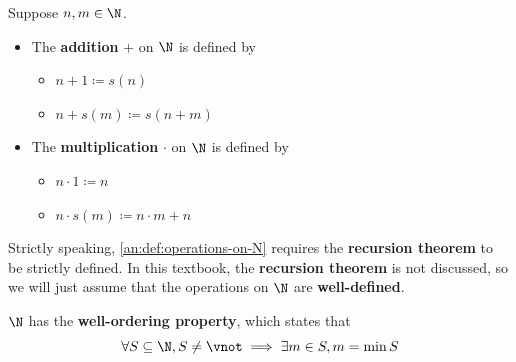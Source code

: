 \bigskip

\begin{definition} \label{an:def:operations-on-N}
  Suppose $n, m \in \N$.
  \begin{itemize}
    \item The \textbf{addition} $+$ on $\N$ is defined by
          \begin{itemize}
            \item $n + 1 \coloneqq s(n)$
            \item $n + s(m) \coloneqq s(n + m)$
          \end{itemize}
    \item The \textbf{multiplication} $\cdot$ on $\N$ is defined by
          \begin{itemize}
            \item $n \cdot 1 \coloneqq n$
            \item $n \cdot s(m) \coloneqq n \cdot m + n$
          \end{itemize}
  \end{itemize}
\end{definition}

\bigskip

\begin{remark}
  Strictly speaking, \cref{an:def:operations-on-N} requires the \textbf{recursion theorem} to be strictly defined.
  In this textbook, the \textbf{recursion theorem} is not discussed, so we will just assume that the operations
  on $\N$ are \textbf{well-defined}.
\end{remark}

\bigskip

\begin{theorem} \label{an:thm:well-ordering-property}
  $\N$ has the \textbf{well-ordering property}, which states that
  \[
    \forall S \subseteq \N, S \neq \vnot \implies \exists m \in S, m = \min S
  \]
\end{theorem}

